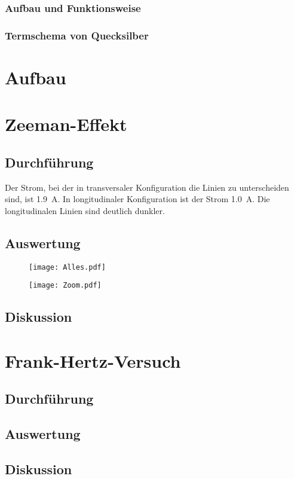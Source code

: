 \subsection{Aufbau und Funktionsweise}

\subsection{Termschema von Quecksilber}

\chapter{Aufbau}

\chapter{Zeeman-Effekt}

\section{Durchführung}

Der Strom, bei der in transversaler Konfiguration die Linien zu unterscheiden
sind, ist \SI{1.9}{\ampere}. In longitudinaler Konfiguration ist der Strom
\SI{1.0}{\ampere}. Die longitudinalen Linien sind deutlich dunkler.

\section{Auswertung}

\begin{figure}[htbp]
    \centering
    \texttt{[image: Alles.pdf]}
    \caption{%
    }
    \label{fig:}
\end{figure}

\begin{figure}[htbp]
    \centering
    \texttt{[image: Zoom.pdf]}
    \caption{%
    }
    \label{fig:}
\end{figure}

\section{Diskussion}

\chapter{Frank-Hertz-Versuch}

\section{Durchführung}

\section{Auswertung}

\section{Diskussion}

\printbibliography



